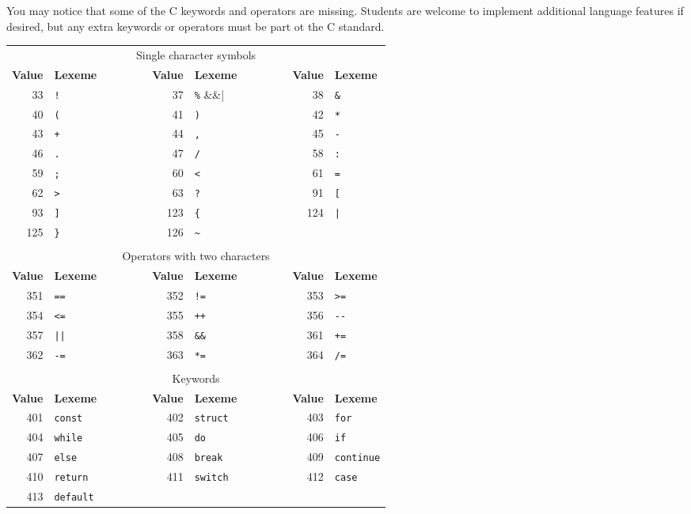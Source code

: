 \documentclass{article}
\begin{document}
You may notice that some of the C keywords and operators are missing.
Students are welcome to implement additional language features if desired,
but any extra keywords or operators must be part ot the C standard.

\begin{table}[t]
	\centering
	\begin{tabular}{rlcrlcrl}
		\multicolumn{8}{c}{Single character symbols}
		\\[1mm]
		{\bf Value} & {\bf Lexeme}
		& ~~~~~~ &
		{\bf Value} & {\bf Lexeme}
		& ~~~~~~ &
		{\bf Value} & {\bf Lexeme}
		\\ \cline{1-2} \cline{4-5} \cline{7-8}
		33 & \verb|!| &&
		37 & \verb|%| &&
		38 & \verb|&| \\
		40 & \verb|(| &&
		41 & \verb|)| &&
		42 & \verb|*| \\
		43 & \verb|+| &&
		44 & \verb|,| &&
		45 & \verb|-| \\
		46 & \verb|.| &&
		47 & \verb|/| &&
		58 & \verb|:| \\
		59 & \verb|;| &&
		60 & \verb|<| &&
		61 & \verb|=| \\
		62 & \verb|>| &&
		63 & \verb|?| &&
		91 & \verb|[| \\
		93 & \verb|]| &&
		123 & \verb|{| &&
		124 & \verb+|+ \\
    125 & \verb|}| &&
    126 & \verb|~| \\
	\\
		\multicolumn{8}{c}{Operators with two characters}
		\\[1mm]
		{\bf Value} & {\bf Lexeme}
		& ~~~~~~ &
		{\bf Value} & {\bf Lexeme}
		& ~~~~~~ &
		{\bf Value} & {\bf Lexeme}
		\\ \cline{1-2} \cline{4-5} \cline{7-8}
		351 & \verb|==| &&
		352 & \verb|!=| &&
		353 & \verb|>=| \\
		354 & \verb|<=| &&
		355 & \verb|++| &&
		356 & \verb|--| \\
		357 & \verb+||+ &&
		358 & \verb|&&| &&
		361 & \verb|+=| \\
		362 & \verb|-=| &&
		363 & \verb|*=| &&
		364 & \verb|/=| \\
	\\
		\multicolumn{8}{c}{Keywords}
		\\[1mm]
		{\bf Value} & {\bf Lexeme}
		& ~~~~~~ &
		{\bf Value} & {\bf Lexeme}
		& ~~~~~~ &
		{\bf Value} & {\bf Lexeme}
		\\ \cline{1-2} \cline{4-5} \cline{7-8}
		401 & \verb|const| &&
		402 & \verb|struct| &&
		403 & \verb|for| \\
		404 & \verb|while| &&
		405 & \verb|do| &&
		406 & \verb|if| \\
		407 & \verb|else| &&
		408 & \verb|break| &&
		409 & \verb|continue| \\
		410 & \verb|return| &&
		411 & \verb|switch| &&
		412 & \verb|case| \\
		413 & \verb|default| \\
	\end{tabular}


\end{table}
\end{document}
